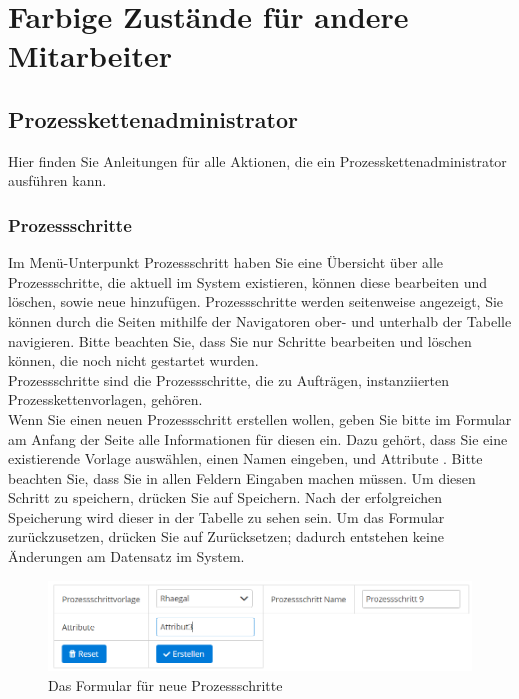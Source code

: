 \documentclass[enabledeprecatedfontcommands,fontsize=12pt,paper=a4,twoside]{scrartcl}
\begin{document}
\clearpage
\section{Farbige Zustände für andere Mitarbeiter}
\subsection{Prozesskettenadministrator}

Hier finden Sie Anleitungen für alle Aktionen, die ein Prozesskettenadministrator ausführen kann.
\subsubsection{Prozessschritte}

Im Menü-Unterpunkt Prozessschritt haben Sie eine Übersicht über alle Prozessschritte, die aktuell im System existieren, können diese bearbeiten und löschen, sowie neue hinzufügen. Prozessschritte werden seitenweise angezeigt, Sie können durch die Seiten mithilfe der Navigatoren ober- und unterhalb der Tabelle navigieren. Bitte beachten Sie, dass Sie nur Schritte bearbeiten und löschen können, die noch nicht gestartet wurden. \\

Prozessschritte sind die Prozessschritte, die zu Aufträgen, instanziierten Prozesskettenvorlagen, gehören. \\

Wenn Sie einen neuen Prozessschritt erstellen wollen, geben Sie bitte im Formular am Anfang der Seite alle Informationen für diesen ein. Dazu gehört, dass Sie eine existierende Vorlage auswählen, einen Namen eingeben, und Attribute . Bitte beachten Sie, dass Sie in allen Feldern Eingaben machen müssen. Um diesen Schritt zu speichern, drücken Sie auf Speichern. Nach der erfolgreichen Speicherung wird dieser in der Tabelle zu sehen sein. Um das Formular zurückzusetzen, drücken Sie auf Zurücksetzen; dadurch entstehen keine Änderungen am Datensatz im System. \\

\begin{figure}[h!]
\begin{center}
 \includegraphics[width=\textwidth]{screenshots/pk/01prozessschrittformular.png}
  \caption{Das Formular für neue Prozessschritte}
  \label{fig:boat2}
\end{center}
\end{figure}
\end{document}
